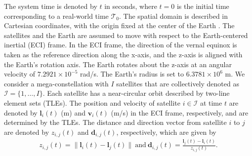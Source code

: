 \documentclass[journal]{IEEEtran}
\begin{document}
The system time is denoted by $t$ in seconds, where $t=0$ is the initial time corresponding to a real-world time $\mathcal{T}_0$. 
The spatial domain is described in Cartesian coordinates, with the origin fixed at the center of the Earth \cite{vallado2022fundamentals}.
The satellites and the Earth are assumed to move with respect to the Earth-centered inertial (ECI) frame.
In the ECI frame, the direction of the vernal equinox is taken as the reference direction along the x-axis, and the z-axis is aligned with the Earth's rotation axis. The Earth rotates about the z-axis at an angular velocity of $7.2921 \times 10^{-5}$ rad/s. The Earth's radius is set to $6.3781 \times 10^6$ m.
We consider a mega-constellation with $I$ satellites that are collectively denoted as $\mathcal{I} = \{1,\dots,I\}$.
Each satellite has a near-circular orbit described by two-line element sets (TLEs).
The position and velocity of satellite $i \in \mathcal{I}$ at time $t$ are denoted by $\mathbf{l}_i(t)$ (m) and $\mathbf{v}_i(t)$ (m/s) in the ECI frame, respectively, and are determined by the TLEs.
The distance and direction vector from satellite $i$ to $j$ are denoted by $z_{i,j}(t)$ and $\mathbf{d}_{i,j}(t)$, respectively, which are given by
\begin{equation}
  \begin{aligned}
    z_{i,j}(t) = \|\mathbf{l}_i(t) - \mathbf{l}_j(t)\|\ 
    \text{and}\ 
    \mathbf{d}_{i,j}(t) = \frac{\mathbf{l}_j(t) - \mathbf{l}_i(t)}{z_{i,j}(t)}.
  \end{aligned}
\end{equation}
\end{document}

